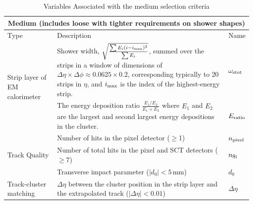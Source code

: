 \documentclass{article}
\begin{document}
\begin{table}[h!t]
\centering
\caption{ Variables Associated with the medium selection criteria \cite{ElectronPerformanceMeasurements}\label{table:mediumVariables}}
\begin{tabular}{|p{5cm}|p{8cm}|p{1cm}| } 
\hline
\multicolumn{3}{|c|}{\textbf{Medium (includes loose with tighter requirements on shower shapes)}} \\\hline
Type&Description&Name		    \\\hline
\multirow{2}{*}{Strip layer of EM calorimeter} & Shower width, $\sqrt{ \frac{\sum E_i (i-i_{\rm{max}})^2 } {\sum E_i} }$, summed over the strips in a window of dimensions of $\Delta\eta\times\Delta\phi\approx 0.0625\times0.2$, corresponding typically to 20 strips in $\eta$, and $i_{\rm{max}}$ is the index of the highest-energy strip. & $\omega_{\rm{stot}}$ \\\cline{2-3}
& The energy deposition ratio $\frac{E_1/E_2}{E_1+E_2}$ where $E_1$ and $E_2$ are the largest and second largest energy depositions in the cluster. & $E_{\rm{ratio}}$ \\\hline
\multirow{3}{*}{Track Quality} & Number of hits in the pixel detector ($\geq$1)&$n_{\rm{pixel}}$ \\\cline{2-3}
& Number of total hits in the pixel and SCT detectors ($\geq$7) & $n_{\rm{Si}}$ \\\cline{2-3}
& Transverse impact parameter ($|d_0|<5\,$mm) & $d_0$ \\\hline
Track-cluster matching & $\Delta\eta$ between the cluster position in the strip layer and the extrapolated track ($|\Delta\eta|<0.01$) & $\Delta\eta$\\\hline
\end{tabular}
\end{table}
\end{document}
